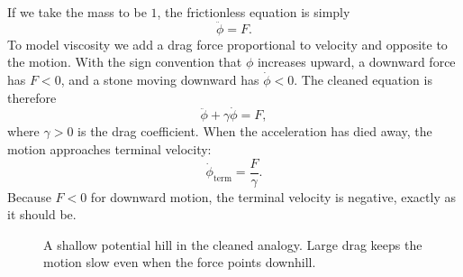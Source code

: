 If we take the mass to be \(1\), the frictionless equation is simply
\begin{equation}
\ddot{\phi}=F.
\end{equation}
To model viscosity we add a drag force proportional to velocity and opposite to the motion. With the sign convention that \(\phi\) increases upward, a downward force has \(F<0\), and a stone moving downward has \(\dot\phi<0\). The cleaned equation is therefore
\begin{equation}
\ddot{\phi}+\gamma \dot{\phi}=F,
\end{equation}
where \(\gamma>0\) is the drag coefficient. When the acceleration has died away, the motion approaches terminal velocity:
\begin{equation}
\dot{\phi}_{\mathrm{term}}=\frac{F}{\gamma}.
\end{equation}
Because \(F<0\) for downward motion, the terminal velocity is negative, exactly as it should be.

\begin{figure}
\centering
{}
\caption{A shallow potential hill in the cleaned analogy. Large drag keeps the motion slow even when the force points downhill.}
\end{figure}

